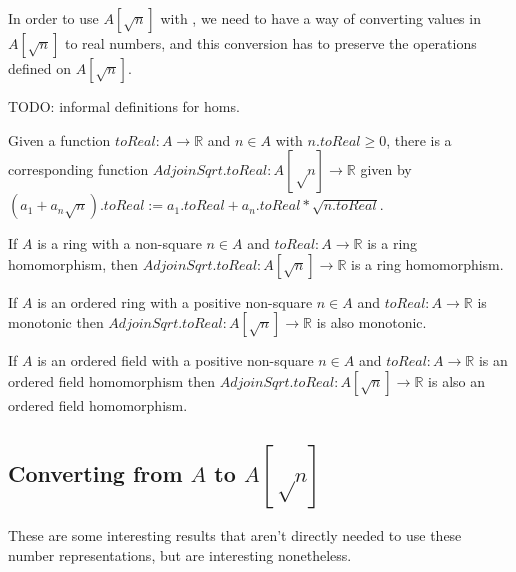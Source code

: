 In order to use $A[\sqrt{n}]$ with , we need to have a way of
converting values in $A[\sqrt{n}]$ to real numbers, and this conversion has to preserve
the operations defined on $A[\sqrt{n}]$.

TODO: informal definitions for homs.


\begin{definition}
  \label{def:adjoinToReal}
  Given a function $toReal : A → ℝ$ and $n ∈ A$ with $n.toReal \geq 0$,
  there is a corresponding function $AdjoinSqrt.toReal : A[√n] → ℝ$ given by
  $(a_1 + a_n\sqrt{n}).toReal := a_1.toReal + a_n.toReal * \sqrt{n.toReal}$.
\end{definition}

\begin{lemma}
  \label{thm:adjoinToRealRingHom}
  If $A$ is a ring with a non-square $n ∈ A$ and $toReal : A → ℝ$ is a
  ring homomorphism, then $AdjoinSqrt.toReal : A[\sqrt{n}] → ℝ$ is a ring
  homomorphism.
\end{lemma}

\begin{lemma}
  \label{thm:adjoinToRealOrderHom}
  If $A$ is an ordered ring with a positive non-square $n ∈ A$ and
  $toReal : A → ℝ$ is monotonic then $AdjoinSqrt.toReal : A[\sqrt{n}] → ℝ$ is
  also monotonic.
\end{lemma}


\begin{lemma}
  \label{thm:adjoinToRealOrderedFieldHom}
  If $A$ is an ordered field with a positive non-square $n ∈ A$ and $toReal : A
  → ℝ$ is an ordered field homomorphism then $AdjoinSqrt.toReal : A[\sqrt{n}] →
  ℝ$ is also an ordered field homomorphism.
\end{lemma}

\subsection{Converting from $A$ to $A[√n]$}

These are some interesting results that aren't directly needed to use these
number representations, but are interesting nonetheless.

